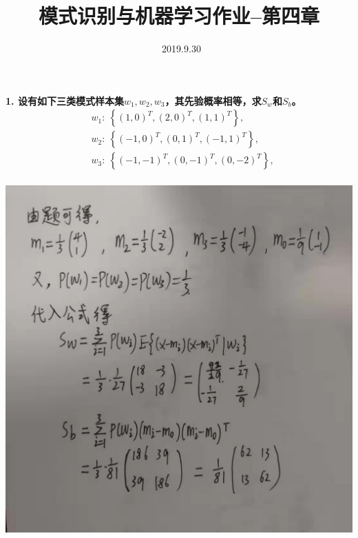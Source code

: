\documentclass[a4paper, UTF8, 12pt]{ctexart}
\title{模式识别与机器学习作业--第四章}
\author{\ 2019.9.30}
\date{}
\begin{document}
    \maketitle
    \pagestyle{plain}
    \allowdisplaybreaks
    \textbf{1. 设有如下三类模式样本集$w_1,w_2,w_3$，其先验概率相等，求$S_w$和$S_b$。} \newline
    \begin{equation*}
        \begin{split}
            &w_1: \ \left\{ {\left(1,0 \right)}^T, {\left(2,0\right)}^T, {\left(1,1\right)}^T \right\}, \\
            &w_2: \ \left\{ {\left(-1,0 \right)}^T, {\left(0,1\right)}^T, {\left(-1,1\right)}^T \right\}, \\
            &w_3: \ \left\{ {\left(-1,-1 \right)}^T, {\left(0,-1\right)}^T, {\left(0,-2\right)}^T \right\}, \\
        \end{split}
    \end{equation*}
    
    \includegraphics[scale=0.4]{asw1.jpg} \\
\end{document}
